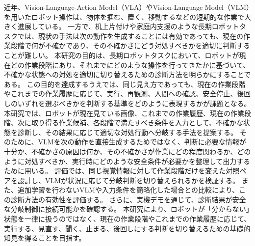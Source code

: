 近年、Vision-Language-Action Model（VLA）やVision-Language Model（VLM）を用いたロボット操作は、物体を掴む、置く、移動するなどの短期的な作業で大きく進展している。
一方で、机上片付けや家庭内支援のような長期ロボットタスクでは、現状の手法は次の動作を生成することには有効であっても、現在の作業段階で何が不確かであり、その不確かさにどう対処すべきかを適切に判断することが難しい。
本研究の目的は、長期ロボットタスクにおいて、ロボットが現在どの作業段階にあり、それまでにどのような操作を行ってきたかに基づいて、不確かな状態への対処を適切に切り替えるための診断方法を明らかにすることである。
この目的を達成するうえでは、同じ見え方であっても、現在の作業段階やこれまでの作業履歴に応じて、実行、再観測、人間への確認、安全停止、後回しのいずれを選ぶべきかを判断する基準をどのように表現するかが課題となる。
本研究では、ロボットが現在見ている画像、これまでの作業履歴、現在の作業段階、次に取り得る作業候補、各段階で満たすべき条件を入力として、不確かな状態を診断し、その結果に応じて適切な対処行動へ分岐する手法を提案する。
そのために、VLMを次の動作を直接生成するためではなく、判断に必要な情報が十分か、不確かさの原因は何か、その不確かさが作業にどの程度関わるか、どのように対処すべきか、実行時にどのような安全条件が必要かを整理して出力するために用いる。
評価では、同じ視覚情報に対して作業段階だけを変えた対照ペアを設計し、VLMが状況に応じて分岐判断を切り替えられるかを検証する。
また、追加学習を行わないVLMや入力条件を簡略化した場合との比較により、この診断方法の有効性を評価する。
さらに、実機デモを通じて、診断結果が安全な分岐制御に接続可能かを確認する。
本研究により、ロボットが「分からない」状態を一律に扱うのではなく、現在の作業段階やこれまでの作業履歴に応じて、実行する、見直す、聞く、止まる、後回しにする判断を切り替えるための基礎的知見を得ることを目指す。
